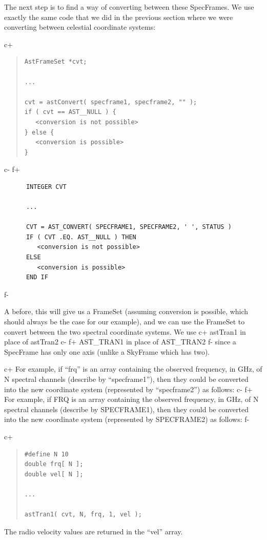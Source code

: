 \documentclass[twoside,11pt]{article}
\begin{document}
The next step is to find a way of converting between these SpecFrames. We
use exactly the same code that we did in the previous section where we were
converting between celestial coordinate systems:

c+
\begin{quote}
\small
\begin{verbatim}
AstFrameSet *cvt;

...

cvt = astConvert( specframe1, specframe2, "" );
if ( cvt == AST__NULL ) {
   <conversion is not possible>
} else {
   <conversion is possible>
}
\end{verbatim}
\normalsize
\end{quote}
c-
f+
\small
\begin{verbatim}
      INTEGER CVT

      ...

      CVT = AST_CONVERT( SPECFRAME1, SPECFRAME2, ' ', STATUS )
      IF ( CVT .EQ. AST__NULL ) THEN
         <conversion is not possible>
      ELSE
         <conversion is possible>
      END IF
\end{verbatim}
\normalsize
f-

A before, this will give us a FrameSet (assuming conversion is possible,
which should always be the case for our example), and we can use the
FrameSet to convert between the two spectral coordinate systems. We use 
c+
astTran1 in place of astTran2
c-
f+
AST\_TRAN1 in place of AST\_TRAN2
f-
since a SpecFrame has only one axis (unlike a SkyFrame which has two).

c+
For example, if ``frq'' is an array containing the observed frequency, in
GHz, of N spectral channels (describe by ``specframe1''), then they
could be converted into the new coordinate system (represented by
``specframe2'') as follows:
c-
f+
For example, if FRQ is an array containing the observed frequency, in
GHz, of N spectral channels (describe by SPECFRAME1), then they
could be converted into the new coordinate system (represented by
SPECFRAME2) as follows:
f-

c+
\begin{quote}
\small
\begin{verbatim}
#define N 10
double frq[ N ];
double vel[ N ];

...

astTran1( cvt, N, frq, 1, vel );
\end{verbatim}
\normalsize
\end{quote}

The radio velocity values are returned in the ``vel'' array.
\end{document}
